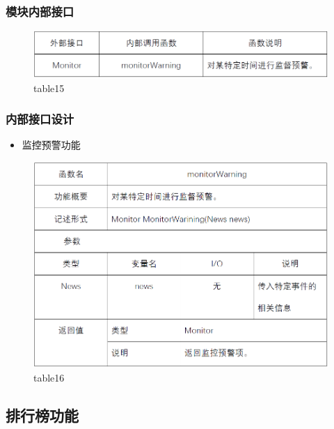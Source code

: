 \subsubsection{模块内部接口}
\begin{figure}[!htbp]
	\centering
	\includegraphics[scale=0.7]{image/b15.png} %
	\caption{table15} %
\end{figure}
\subsubsection{内部接口设计}
\begin{itemize}
	\item 监控预警功能
\end{itemize}
\begin{figure}[!htbp]
	\centering
	\includegraphics[scale=0.7]{image/b16.png} %
	\caption{table16} %
\end{figure}
\subsection{排行榜功能}
